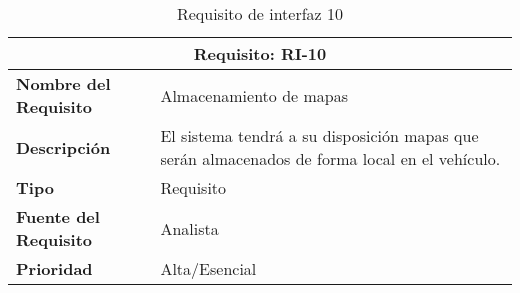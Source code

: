 \begin{table}[H]
\begin{center}
\begin{tabular}{p{} p{7cm}}
\multicolumn{2}{c}{\textbf{Requisito: RI-10} } \\
\hline \hline
\textbf{Nombre del Requisito} &  Almacenamiento de mapas\\
\hline
\textbf{Descripción} & El sistema tendrá a su disposición mapas que serán almacenados de forma local en el vehículo. \\
\hline
\textbf{Tipo} & Requisito \\
\hline
\textbf{Fuente del Requisito} & Analista \\
\hline
\textbf{Prioridad} & Alta/Esencial \\ \hline
\end{tabular}
\caption{Requisito de interfaz 10}
\label{tab:RI-10}
\end{center}
\end{table}
